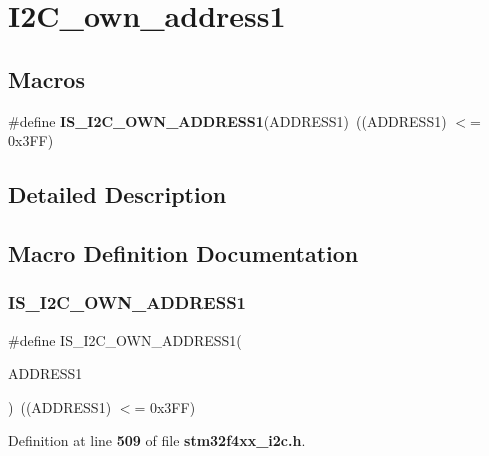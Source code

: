 \section{I2\+C\+\_\+own\+\_\+address1}
\label{group__I2C__own__address1}
\subsection*{Macros}
\begin{DoxyCompactItemize}
\item 
\#define \textbf{ I\+S\+\_\+\+I2\+C\+\_\+\+O\+W\+N\+\_\+\+A\+D\+D\+R\+E\+S\+S1}(A\+D\+D\+R\+E\+S\+S1)~((A\+D\+D\+R\+E\+S\+S1) $<$= 0x3\+F\+F)
\end{DoxyCompactItemize}


\subsection{Detailed Description}


\subsection{Macro Definition Documentation}
\mbox{\label{group__I2C__own__address1_gad84e8b9523d45b6105b4d5cb68994a79}} 
\subsubsection{I\+S\+\_\+\+I2\+C\+\_\+\+O\+W\+N\+\_\+\+A\+D\+D\+R\+E\+S\+S1}
{\footnotesize\ttfamily \#define I\+S\+\_\+\+I2\+C\+\_\+\+O\+W\+N\+\_\+\+A\+D\+D\+R\+E\+S\+S1(\begin{DoxyParamCaption}\item[{}]{A\+D\+D\+R\+E\+S\+S1 }\end{DoxyParamCaption})~((A\+D\+D\+R\+E\+S\+S1) $<$= 0x3\+F\+F)}



Definition at line \textbf{ 509} of file \textbf{ stm32f4xx\+\_\+i2c.\+h}.

